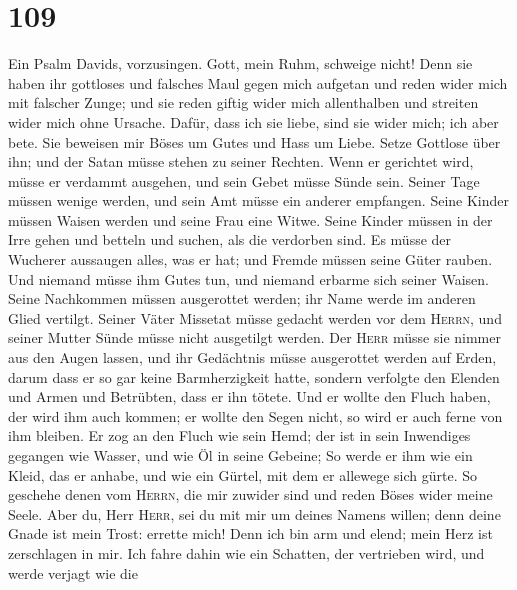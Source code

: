 \hypertarget{section-108}{%
\section{109}\label{section-108}}

 Ein Psalm Davids, vorzusingen. Gott, mein Ruhm, schweige
nicht!  Denn sie haben ihr gottloses und falsches Maul
gegen mich aufgetan und reden wider mich mit falscher Zunge;
 und sie reden giftig wider mich allenthalben und streiten
wider mich ohne Ursache.  Dafür, dass ich sie liebe, sind
sie wider mich; ich aber bete.  Sie beweisen mir Böses um
Gutes und Hass um Liebe.  Setze Gottlose über ihn; und der
Satan müsse stehen zu seiner Rechten.  Wenn er gerichtet
wird, müsse er verdammt ausgehen, und sein Gebet müsse Sünde sein.
 Seiner Tage müssen wenige werden, und sein Amt müsse ein
anderer empfangen.  Seine Kinder müssen Waisen werden und
seine Frau eine Witwe.  Seine Kinder müssen in der Irre
gehen und betteln und suchen, als die verdorben sind.  Es
müsse der Wucherer aussaugen alles, was er hat; und Fremde müssen seine
Güter rauben.  Und niemand müsse ihm Gutes tun, und
niemand erbarme sich seiner Waisen.  Seine Nachkommen
müssen ausgerottet werden; ihr Name werde im anderen Glied vertilgt.
 Seiner Väter Missetat müsse gedacht werden vor dem
\textsc{Herrn}, und seiner Mutter Sünde müsse nicht ausgetilgt werden.
 Der \textsc{Herr} müsse sie nimmer aus den Augen lassen,
und ihr Gedächtnis müsse ausgerottet werden auf Erden, 
darum dass er so gar keine Barmherzigkeit hatte, sondern verfolgte den
Elenden und Armen und Betrübten, dass er ihn tötete.  Und
er wollte den Fluch haben, der wird ihm auch kommen; er wollte den Segen
nicht, so wird er auch ferne von ihm bleiben.  Er zog an
den Fluch wie sein Hemd; der ist in sein Inwendiges gegangen wie Wasser,
und wie Öl in seine Gebeine;  So werde er ihm wie ein
Kleid, das er anhabe, und wie ein Gürtel, mit dem er allewege sich
gürte.  So geschehe denen vom \textsc{Herrn}, die mir
zuwider sind und reden Böses wider meine Seele.  Aber du,
Herr \textsc{Herr}, sei du mit mir um deines Namens willen; denn deine
Gnade ist mein Trost: errette mich!  Denn ich bin arm und
elend; mein Herz ist zerschlagen in mir.  Ich fahre dahin
wie ein Schatten, der vertrieben wird, und werde verjagt wie die
